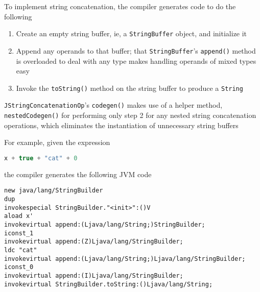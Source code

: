\documentclass[8pt,a4paper,compress]{beamer}
\begin{document}
\begin{frame}[fragile]
\pause

To implement string concatenation, the compiler generates code to do the following
\begin{enumerate}
\item Create an empty string buffer, ie, a \lstinline{StringBuffer} object, and initialize it
\item Append any operands to that buffer; that \lstinline{StringBuffer}'s \lstinline{append()} method is overloaded to deal with any type makes handling operands of mixed types easy
\item Invoke the \lstinline{toString()} method on the string buffer to produce a \lstinline{String}
\end{enumerate}

\pause
\bigskip

\lstinline{JStringConcatenationOp}'s \lstinline{codegen()} makes use of a helper method, \lstinline{nestedCodegen()} for performing only step 2 for any nested string concatenation operations, which eliminates the instantiation of unnecessary string buffers

\pause
\bigskip

For example, given the \jmm expression
\begin{lstlisting}[language=Java]
x + true + "cat" + 0
\end{lstlisting}
the compiler generates the following JVM code
\begin{lstlisting}[language={}]
new java/lang/StringBuilder
dup
invokespecial StringBuilder."<init>":()V
aload x'
invokevirtual append:(Ljava/lang/String;)StringBuilder;
iconst_1
invokevirtual append:(Z)Ljava/lang/StringBuilder;
ldc "cat"
invokevirtual append:(Ljava/lang/String;)Ljava/lang/StringBuilder;
iconst_0
invokevirtual append:(I)Ljava/lang/StringBuilder;
invokevirtual StringBuilder.toString:()Ljava/lang/String;
\end{lstlisting}
\end{frame}
\end{document}
